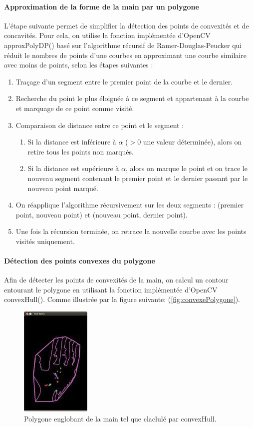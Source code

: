 \paragraph{Approximation de la forme de la main par un polygone}
L’étape suivante permet de simplifier la détection des points de convexités et de concavités. Pour cela, on utilise la fonction implémentée d’OpenCV approxPolyDP() basé sur l’algorithme récursif de Ramer-Douglas-Peucker qui réduit le nombres de points d’une courbes en approximant une courbe similaire avec moins de points, selon les étapes suivantes :

\begin{enumerate}
\item Traçage d’un segment entre le premier point de la courbe et le dernier.
\item Recherche du point le plus éloignée à ce segment et appartenant à la courbe et marquage de ce point comme visité.
\item Comparaison de distance entre ce point et le segment :
\begin{enumerate}
\item Si la distance est inférieure à $\alpha$ ($>0$ une valeur déterminée), alors on retire tous les points non marqués.
\item Si la distance est supérieure à $\alpha$, alors on marque le point et on trace le nouveau segment contenant le premier point et le dernier passant par le nouveau point marqué.
\end{enumerate}
\item On réapplique l’algorithme récursivement sur les deux segments : (premier point, nouveau point) et (nouveau point, dernier point).
\item Une fois la récursion terminée, on retrace la nouvelle courbe avec les points visités uniquement.
\end{enumerate}

\paragraph{Détection des points convexes du polygone}
Afin de détecter les points de convexités de la main, on calcul un contour entourant le polygone en utilisant la fonction implémentée d’OpenCV convexHull(). Comme illustrée par la figure suivante: (\autoref{fig:convexePolygone}).

\begin{figure}[htb!]
\centerline{\includegraphics{convexePolygone.jpg}}
\caption{Polygone englobant de la main tel que claclulé par convexHull.}
\label{fig:convexePolygone}
\end{figure}

